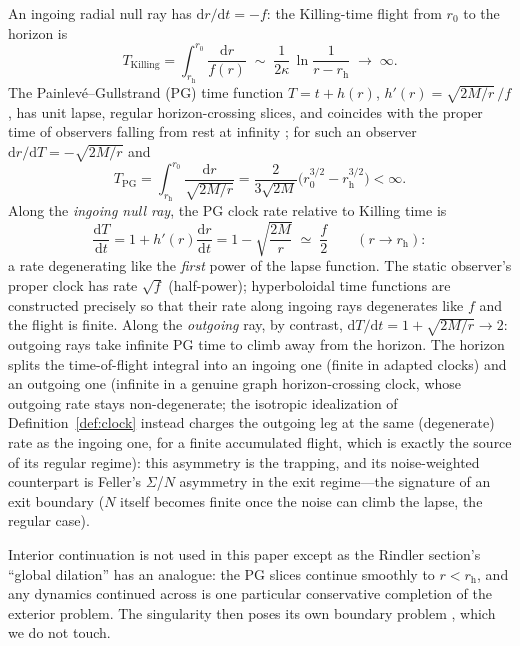 \documentclass[11pt]{article}
\theoremstyle{definition}
\theoremstyle{remark}
\newcommand{\dd}{\mathrm{d}}
\newcommand{\rh}{r_{\mathrm{h}}}
\begin{document}
An ingoing radial null ray has $\dd r/\dd t=-f$: the Killing-time
flight from $r_{0}$ to the horizon is
\begin{equation}
T_{\mathrm{Killing}}
=\int_{\rh}^{r_{0}}\frac{\dd r}{f(r)}
\;\sim\;\frac{1}{2\kappa}\,\ln\frac{1}{r-\rh}\;\longrightarrow\;\infty .
\label{eq:tofkilling}
\end{equation}
The Painlev\'e--Gullstrand (PG) time function $T=t+h(r)$,
$h'(r)=\sqrt{2M/r}\,/f$, has unit lapse, regular horizon-crossing
slices, and coincides with the proper time of observers falling from
rest at infinity \cite{MartelPoisson2001}; for such an observer
$\dd r/\dd T=-\sqrt{2M/r}$ and
\begin{equation}
T_{\mathrm{PG}}
=\int_{\rh}^{r_{0}}\frac{\dd r}{\sqrt{2M/r}}
=\frac{2}{3\sqrt{2M}}\bigl(r_{0}^{3/2}-\rh^{3/2}\bigr)<\infty .
\label{eq:tofpg}
\end{equation}
Along the \emph{ingoing null ray}, the PG clock rate relative to
Killing time is
\begin{equation}
\frac{\dd T}{\dd t}
=1+h'(r)\frac{\dd r}{\dd t}
=1-\sqrt{\frac{2M}{r}}
\;\simeq\;\frac{f}{2}\qquad(r\to\rh):
\label{eq:pgrate}
\end{equation}
a rate degenerating like the \emph{first} power of the lapse
function. The static observer's proper clock has rate $\sqrt f$
(half-power); hyperboloidal time functions
\cite{Warnick2015,Jaramillo2021} are constructed precisely so that
their rate along ingoing rays degenerates like $f$ and the flight is
finite. Along the \emph{outgoing} ray, by contrast,
$\dd T/\dd t=1+\sqrt{2M/r}\to 2$: outgoing rays take infinite PG time
to climb away from the horizon. The horizon splits the time-of-flight
integral into an ingoing one (finite in adapted clocks) and an
outgoing one (infinite in a genuine graph horizon-crossing clock, whose
outgoing rate stays non-degenerate; the isotropic idealization of
Definition~\ref{def:clock} instead charges the outgoing leg at the same
(degenerate) rate as the ingoing one, for a finite accumulated flight,
which is exactly the source of its regular regime): this asymmetry is the trapping,
and its noise-weighted counterpart is Feller's $\Sigma$/$N$ asymmetry
in the exit regime---the signature of an exit boundary ($N$ itself
becomes finite once the noise can climb the lapse, the regular case).

Interior continuation is not used in this paper except as the Rindler
section's ``global dilation'' has an analogue: the PG slices continue
smoothly to $r<\rh$, and any dynamics continued across is one
particular conservative completion of the exterior problem. The
singularity then poses its own boundary problem
\cite{HorowitzMarolf1995,HorowitzMaldacena}, which we do not touch.
\end{document}
